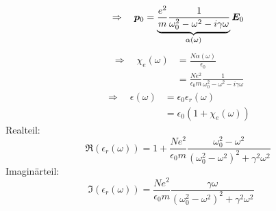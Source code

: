 \begin{equation*}
\Rightarrow \quad \bm{p}_0 = \underbrace{\frac{e^2}{m} \frac{1}{\omega_0^2 - \omega^2 - i \gamma \omega}}_{\alpha (\omega)} \bm{E}_0
\end{equation*}
\begin{align*}
\Rightarrow \quad \chi_e(\omega) &= \frac{N \alpha(\omega)}{\epsilon_0} \\
&= \frac{N e^2}{\epsilon_0 m} \frac{1}{\omega_0^2 - \omega^2 - i \gamma \omega}
\end{align*}
\begin{align*}
\Rightarrow \quad \epsilon(\omega) &= \epsilon_0 \epsilon_r(\omega) \\
&= \epsilon_0 (1 + \chi_e(\omega))
\end{align*}
Realteil:
$$ \Re(\epsilon_r(\omega)) = 1 + \frac{Ne^2}{\epsilon_0 m} \frac{\omega_0^2 - \omega^2}{(\omega_0^2 - \omega^2)^2 + \gamma^2 \omega^2} $$
Imaginärteil:
$$ \Im(\epsilon_r(\omega)) = \frac{N e^2}{\epsilon_0 m} \frac{\gamma \omega}{(\omega_0^2 - \omega^2)^2 + \gamma^2 \omega^2} \quad \ \  $$

